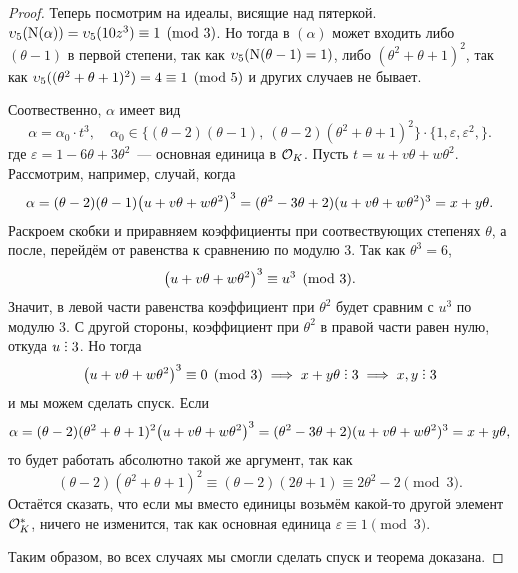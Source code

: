 \begin{proof}
	 		Теперь посмотрим на идеалы, висящие над пятеркой. $\v_5(\Nm(\alpha)) = \v_5(10z^3) \equiv 1 \pmod{3}$. Но тогда в $(\alpha)$ может входить либо $(\theta - 1)$ в первой степени, так как $\v_5\lr*{\Nm(\theta - 1) = 1}$, либо $(\theta^2 + \theta + 1)^2$, так как $\v_5((\theta^2 + \theta + 1)^2) = 4 \equiv 1 \pmod{5}$ и других случаев не бывает. 

	 		Соотвественно, $\alpha$ имеет вид 
	 		\[
	 			\alpha = \alpha_0 \cdot t^3, \quad \alpha_0 \in \{ (\theta - 2)(\theta - 1), \ (\theta - 2)(\theta^2 + \theta + 1)^2 \} \cdot \{ 1, \varepsilon, \varepsilon^2, \}. 
	 		\]
	 		где $\varepsilon = 1 - 6\theta + 3\theta^2$~--- основная единица в $\cO_K$. 
	 		Пусть $t = u + v\theta + w \theta^2$. Рассмотрим, например, случай, когда 
	 		\[
  			\alpha = (\theta - 2)(\theta - 1)\lr*{u + v\theta + w\theta^2}^3 = (\theta^2 - 3\theta + 2)(u + v\theta + w\theta^2)^3 = x + y\theta. 
  			\]
  			Раскроем скобки и приравняем коэффициенты при соотвествующих степенях $\theta$, а после, перейдём от равенства к сравнению по модулю 3. Так как $\theta^3 = 6$, 
  			\[
  				\lr*{u + v\theta + w\theta^2}^3 \equiv u^3 \pmod{3}.
  			\]
  			Значит, в левой части равенства коэффициент при $\theta^2$ будет сравним с $u^3$ по модулю 3. С другой стороны, коэффициент при $\theta^2$ в правой части равен нулю, откуда $u \divby 3$. Но тогда  
  			\[
  				\lr*{u + v\theta + w\theta^2}^3 \equiv 0 \pmod{3} \implies x + y \theta \divby 3 \implies x, y \divby 3
  			\]
  			и мы можем сделать спуск. Если 
  			\[
  			\alpha = (\theta - 2)(\theta^2 + \theta + 1)^2\lr*{u + v\theta + w\theta^2}^3 = (\theta^2 - 3\theta + 2)(u + v\theta + w\theta^2)^3 = x + y\theta,
  			\]
  			то будет работать абсолютно такой же аргумент, так как 
  			\[
  				(\theta - 2)(\theta^2 + \theta + 1)^2 \equiv (\theta - 2)(2\theta + 1) \equiv 2\theta^2 - 2 \pmod{3}.
  			\]
  			Остаётся сказать, что если мы вместо единицы возьмём какой-то другой элемент $\cO_{K}^*$, ничего не изменится, так как основная единица $\varepsilon \equiv 1 \pmod{3}$.

  			Таким образом, во всех случаях мы смогли сделать спуск и теорема доказана. 



	 	\end{proof}

	 	



	  	

	  


 



